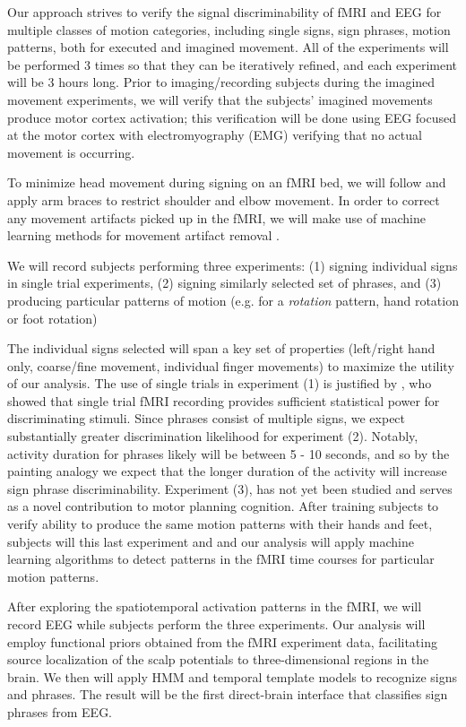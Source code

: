 \documentclass{proposal}
\begin{document}
Our approach strives to verify the signal discriminability of fMRI and EEG for multiple classes of motion categories, including single signs, sign phrases, motion patterns, both for executed and imagined movement. All of the experiments will be performed 3 times so that they can be iteratively refined, and each experiment will be 3 hours long. Prior to imaging/recording subjects during the imagined movement experiments, we will verify that the subjects' imagined movements produce motor cortex activation; this verification will be done using EEG focused at the motor cortex with electromyography (EMG) verifying that no actual movement is occurring.

To minimize head movement during signing on an fMRI bed, we will follow \cite{culham2003vgg} and apply arm braces to restrict shoulder and elbow movement. In order to correct any movement artifacts picked up in the fMRI, we will make use of machine learning methods for movement artifact removal \cite{mckeown1998afd}.

We will record subjects performing three experiments: (1) signing individual signs in single trial experiments, (2) signing similarly selected set of phrases, and (3) producing particular patterns of motion (e.g. for a \textit{rotation} pattern, hand rotation or foot rotation)

The individual signs selected will span a key set of properties (left/right hand only, coarse/fine movement, individual finger movements) to maximize the utility of our analysis. The use of single trials in experiment (1) is justified by \cite{buckner1996dca}, who showed that single trial fMRI recording provides sufficient statistical power for discriminating stimuli. Since phrases consist of multiple signs, we expect substantially greater discrimination likelihood for experiment (2). Notably, activity duration for phrases likely will be between 5 - 10 seconds, and so by the painting analogy we expect that the longer duration of the activity will increase sign phrase discriminability. Experiment (3), has not yet been studied and serves as a novel contribution to motor planning cognition. After training subjects to verify ability to produce the same motion patterns with their hands and feet, subjects will this last experiment and and our analysis will apply machine learning algorithms to detect patterns in the fMRI time courses for particular motion patterns.

After exploring the spatiotemporal activation patterns in the fMRI, we will record EEG while subjects perform the three experiments. Our analysis will employ functional priors obtained from the fMRI experiment data, facilitating source localization of the scalp potentials to three-dimensional regions in the brain. We then will apply HMM and temporal template models to recognize signs and phrases. The result will be the first direct-brain interface that classifies sign phrases from EEG.
\end{document}
